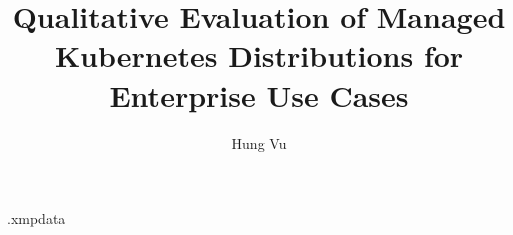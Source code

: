 \begin{filecontents*}{\jobname.xmpdata}
\end{filecontents*}
\documentclass[oneside,pdfa,breaklinks]{aaltoseries}
\makeatletter
{}
\hypersetup{hidelinks}              
\makeatother
\usepackage[finnish,english]{babel}   
\usepackage{setspace}                 %
\usepackage{afterpage}                %

\usepackage{longtable}
\usepackage{amsmath}
\usepackage{url}
\def\UrlBreaks{\do\/\do-}
\usepackage{breakurl}
\usepackage{xpatch}
\usepackage{array}
\usepackage{booktabs}
\usepackage{tablefootnote}
\usepackage[
backend=biber,
sorting=none,
sortcites=true,
defernumbers=false,
bibstyle=ieee,
citestyle=numeric,
]{biblatex}
  {\printtext[parens]{\usebibmacro{date}}}
  {\iffieldundef{year}
    {}
    {\printtext[parens]{\usebibmacro{date}}}}
  {}
  {\typeout{There was an error patching biblatex-ieee (specifically, ieee.bbx's @online driver)}}

\usepackage{xurl}
\usepackage{placeins}
\emergencystretch 3em




\providecommand{\tightlist}{%
  \setlength{\itemsep}{0pt}\setlength{\parskip}{0pt}}

% 

\usepackage{xcolor}
\usepackage{soul}


\author{Hung Vu}
\title{Qualitative Evaluation of Managed Kubernetes Distributions for Enterprise Use Cases}





